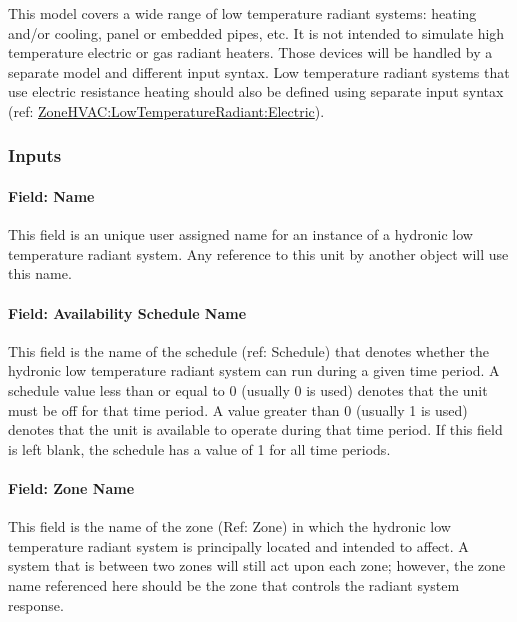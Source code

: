 This model covers a wide range of low temperature radiant systems: heating and/or cooling, panel or embedded pipes, etc. It is not intended to simulate high temperature electric or gas radiant heaters. Those devices will be handled by a separate model and different input syntax. Low temperature radiant systems that use electric resistance heating should also be defined using separate input syntax (ref: \hyperref[zonehvaclowtemperatureradiantelectric]{ZoneHVAC:LowTemperatureRadiant:Electric}).

\subsubsection{Inputs}\label{inputs-5-022}

\paragraph{Field: Name}\label{field-name-5-018}

This field is an unique user assigned name for an instance of a hydronic low temperature radiant system. Any reference to this unit by another object will use this name.

\paragraph{Field: Availability Schedule Name}\label{field-availability-schedule-name-5-003}

This field is the name of the schedule (ref: Schedule) that denotes whether the hydronic low temperature radiant system can run during a given time period. A schedule value less than or equal to 0 (usually 0 is used) denotes that the unit must be off for that time period. A value greater than 0 (usually 1 is used) denotes that the unit is available to operate during that time period. If this field is left blank, the schedule has a value of 1 for all time periods.

\paragraph{Field: Zone Name}\label{field-zone-name-009}

This field is the name of the zone (Ref: Zone) in which the hydronic low temperature radiant system is principally located and intended to affect. A system that is between two zones will still act upon each zone; however, the zone name referenced here should be the zone that controls the radiant system response.

